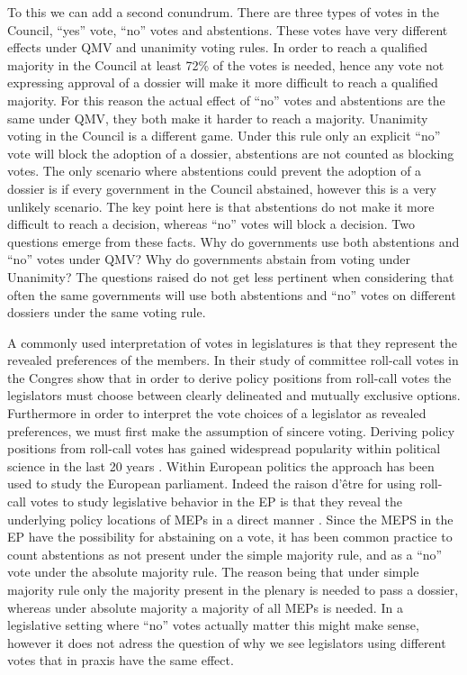 To this we can add a second conundrum. There are three types of votes in the Council, ``yes'' vote, ``no'' votes and abstentions. These votes have very different effects under QMV and unanimity voting rules. In order to reach a qualified majority in the Council at least 72\% of the votes is needed, hence any vote not expressing approval of a dossier will make it more difficult to reach a qualified majority. For this reason the actual effect of ``no'' votes and abstentions are the same under QMV, they both make it harder to reach a majority. Unanimity voting in the Council is a different game. Under this rule only an explicit ``no'' vote will block the adoption of a dossier, abstentions are not counted as blocking votes. The only scenario where abstentions could prevent the adoption of a dossier is if every government in the Council abstained, however this is a very unlikely scenario. The key point here is that abstentions do not make it more difficult to reach a decision, whereas ``no'' votes will block a decision. Two questions emerge from these facts. Why do governments use both abstentions and ``no'' votes under QMV? Why do governments abstain from voting under Unanimity? The questions raised do not get less pertinent when considering that often the same governments will use both abstentions and ``no'' votes on different dossiers under the same voting rule.

A commonly used interpretation of votes in legislatures is that they represent the revealed preferences of the members. In their study of committee roll-call votes in the Congres \citep{KrehbielRivers1988} show that in order to derive policy positions from roll-call votes the legislators must choose between clearly delineated and mutually exclusive options. Furthermore in order to interpret the vote choices of a legislator as revealed preferences, we must first make the assumption of sincere voting. Deriving policy positions from roll-call votes has gained widespread popularity within political science in the last 20 years \citetext{see \citealt{volden1998,Schickler2000,ClintonJackmanRivers2004}}. Within European politics the approach has been used to study the European parliament. Indeed the raison d'être for using roll-call votes to study legislative behavior in the EP is that they reveal the underlying policy locations of MEPs in a direct manner \citep{Hix2002,HixNouryRoland2007,HixNoury2009}. Since the MEPS in the EP have the possibility for abstaining on a vote, it has been common practice to count abstentions as not present under the simple majority rule, and as a ``no'' vote under the absolute majority rule. The reason being that under simple majority rule only the majority present in the plenary is needed to pass a dossier, whereas under absolute majority a majority of all MEPs is needed. In a legislative setting where ``no'' votes actually matter this might make sense, however it does not adress the question of why we see legislators using different votes that in praxis have the same effect.

